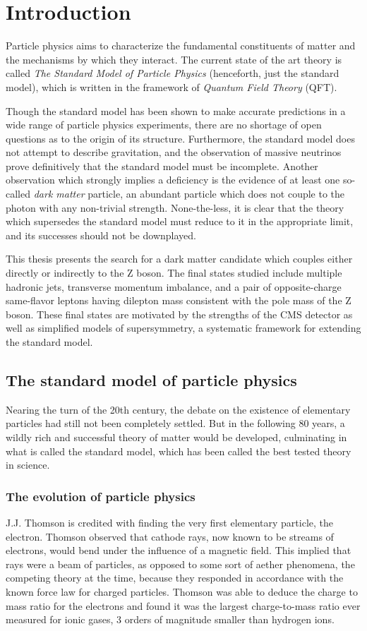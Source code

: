 \chapter{Introduction}
  Particle physics aims to characterize the fundamental constituents of matter and the mechanisms by which they interact. The current state of the art theory is called \emph{The Standard Model of Particle Physics} (henceforth, just the standard model), which is written in the framework of \emph{Quantum Field Theory} (QFT).

  Though the standard model has been shown to make accurate predictions in a wide range of particle physics experiments, there are no shortage of open questions as to the origin of its structure. Furthermore, the standard model does not attempt to describe gravitation, and the observation of massive neutrinos prove definitively that the standard model must be incomplete. Another observation which strongly implies a deficiency is the evidence of at least one so-called \emph{dark matter} particle, an abundant particle which does not couple to the photon with any non-trivial strength. None-the-less, it is clear that the theory which supersedes the standard model must reduce to it in the appropriate limit, and its successes should not be downplayed.

  This thesis presents the search for a dark matter candidate which couples either directly or indirectly to the Z boson. The final states studied include multiple hadronic jets, transverse momentum imbalance, and a pair of opposite-charge same-flavor leptons having dilepton mass consistent with the pole mass of the Z boson. These final states are motivated by the strengths of the CMS detector as well as simplified models of supersymmetry, a systematic framework for extending the standard model. 

\section{The standard model of particle physics}
  Nearing the turn of the 20th century, the debate on the existence of elementary particles had still not been completely settled. But in the following 80 years, a wildly rich and successful theory of matter would be developed, culminating in what is called the standard model, which has been called the best tested theory in science.

  \subsection{The evolution of particle physics}
   J.J. Thomson is credited with finding the very first elementary particle, \cite{thomson_electron} the electron. Thomson observed that cathode rays, now known to be streams of electrons, would bend under the influence of a magnetic field. This implied that rays were a beam of particles, as opposed to some sort of aether phenomena, the competing theory at the time, because they responded in accordance with the known force law for charged particles. Thomson was able to deduce the charge to mass ratio for the electrons and found it was the largest charge-to-mass ratio ever measured for ionic gases, 3 orders of magnitude smaller than hydrogen ions.

